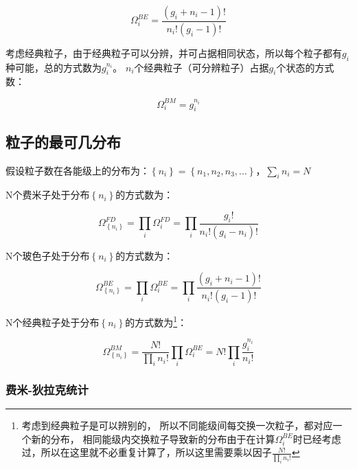 \begin{equation}\label{33-2}
\Omega _i^{BE}  = \frac{{\left( {g_i  + n_i  - 1} \right)!}}{{n_i !\left( {g_i  - 1} \right)!}}
\end{equation}


考虑经典粒子，由于经典粒子可以分辨，并可占据相同状态，所以每个粒子都有$g_i$种可能，总的方式数为$g_i ^{n_i } $。
$n_i$个经典粒子（可分辨粒子）占据$g_i$个状态的方式数：

\begin{equation}\label{33-3}
\Omega _i^{BM}  = g_i ^{n_i }
\end{equation}


\subsection{粒子的最可几分布}


假设粒子数在各能级上的分布为：$\left\{ {n_i } \right\} = \left\{ {n_1 ,n_2 ,n_3 ,...} \right\}$，$\sum\limits_i {n_i }  = N$

N个费米子处于分布$\left\{ {n_i } \right\}$的方式数为：

\begin{equation}\label{33-4}
\Omega _{\left\{ {n_i } \right\}}^{FD}  = \prod\limits_i {\Omega _i^{FD} }  = \prod\limits_i {\frac{{g_i !}}{{n_i !\left( {g_i  - n_i } \right)!}}}
\end{equation}


N个玻色子处于分布$\left\{ {n_i } \right\}$的方式数为：


\begin{equation}\label{33-5}
\Omega _{\left\{ {n_i } \right\}}^{BE}  = \prod\limits_i {\Omega _i^{BE} }  = \prod\limits_i {\frac{{\left( {g_i  + n_i  - 1} \right)!}}{{n_i !\left( {g_i  - 1} \right)!}}}
\end{equation}

N个经典粒子处于分布$\left\{ {n_i } \right\}$的方式数为\footnote{考虑到经典粒子是可以辨别的，
所以不同能级间每交换一次粒子，都对应一个新的分布，
相同能级内交换粒子导致新的分布由于在计算$\Omega _i^{BE} $时已经考虑过，所以在这里就不必重复计算了，所以这里需要乘以因子$\frac{{N!}}{{\prod\limits_i {n_i !} }}$}：

\begin{equation}\label{33-6}
\Omega _{\left\{ {n_i } \right\}}^{BM}  = \frac{{N!}}{{\prod\limits_i {n_i !} }}\prod\limits_i {\Omega _i^{BE} }  = N!\prod\limits_i {\frac{{g_i ^{n_i } }}{{n_i !}}}
\end{equation}

\subsubsection{费米-狄拉克统计}

